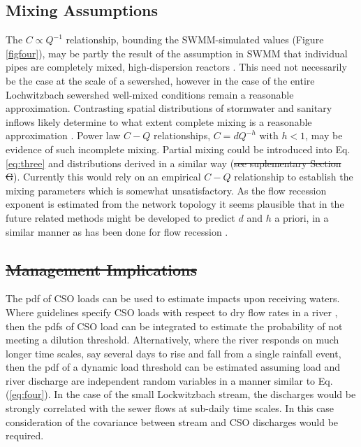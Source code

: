 \documentclass[draft,linenumbers]{agujournal2018}
\providecommand{\DIFadd}[1]{{\protect\color{blue}\uwave{#1}}} %
\providecommand{\DIFdel}[1]{{\protect\color{red}\sout{#1}}}                      %
\providecommand{\DIFaddbegin}{} %
\providecommand{\DIFaddend}{} %
\providecommand{\DIFdelbegin}{} %
\providecommand{\DIFdelend}{} %
\begin{document}
\subsection{Mixing Assumptions}
The $C \propto Q^{-1}$ relationship, bounding the SWMM-simulated values (Figure \ref{figfour}), may be partly the result of the assumption in SWMM that individual pipes are completely mixed, high-dispersion reactors \citep{Rossmann2010}. This need not necessarily be the case at the scale of a sewershed, however in the case of the entire Lochwitzbach sewershed well-mixed conditions remain a reasonable approximation. Contrasting spatial distributions of stormwater and sanitary inf\/lows likely determine to what extent complete mixing is a reasonable approximation \citep{Krebs_1999}. Power law $C-Q$ relationships, $C = d Q^{-h}$ with $h < 1$, may be evidence of such incomplete mixing. Partial mixing could be introduced into Eq. \ref{eq:three} and distributions derived in a similar way (\DIFdelbegin \DIFdel{see suplementary Section G}\DIFdelend \DIFaddbegin \DIFadd{Text S1}\DIFaddend ). Currently this would rely on an empirical $C-Q$ relationship to establish the mixing parameters which is somewhat unsatisfactory. As the f\/low recession exponent is estimated from the network topology it seems plausible that in the future related methods might be developed to predict $d$ and $h$ a priori, in a similar manner as has been done for f\/low recession \citep{Biswal_2014}.

\subsection{\DIFdelbegin \DIFdel{Management Implications}\DIFdelend \DIFaddbegin \DIFadd{Assessing impacts on receiving waters}\DIFaddend }
The pdf of CSO loads can be used to estimate impacts upon receiving waters. Where guidelines specify CSO loads with respect to dry f\/low rates in a river \citep{Holzer_1998}, then the pdfs of CSO load can be integrated to estimate the probability of not meeting a dilution threshold. Alternatively, where the river responds on much longer time scales, say several days to rise and fall from a single rainfall event, then the pdf of a dynamic load threshold can be estimated assuming load and river discharge are independent random variables in a manner similar to Eq. (\ref{eq:four}). In the case of the small Lockwitzbach stream, the discharges would be strongly correlated with the sewer f\/lows at sub-daily time scales. In this case consideration of the covariance between stream and CSO discharges would be required.
\DIFdelbegin %
\end{document}
